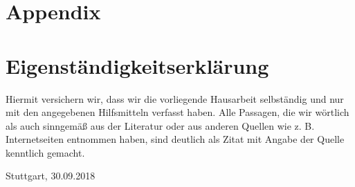 \newpage
\section{Appendix}

\setcounter{table}{0}
\renewcommand{\thetable}{A\arabic{table}}

\setcounter{figure}{0}
\renewcommand{\thefigure}{A\arabic{figure}}




\clearpage
\section*{Eigenständigkeitserklärung}
\vspace*{2cm}
\begin{center}
	\begin{minipage}[t]{0.8\textwidth}
		Hiermit versichern wir, dass wir die vorliegende Hausarbeit selbständig und nur mit den angegebenen Hilfsmitteln verfasst haben. Alle Passagen, die wir wörtlich als auch sinngemäß aus der Literatur oder aus anderen Quellen wie z. B. Internetseiten entnommen haben, sind deutlich als Zitat mit Angabe der Quelle kenntlich gemacht.
		
		\vspace*{60mm}
		Stuttgart, 30.09.2018
	\end{minipage}
\end{center}




